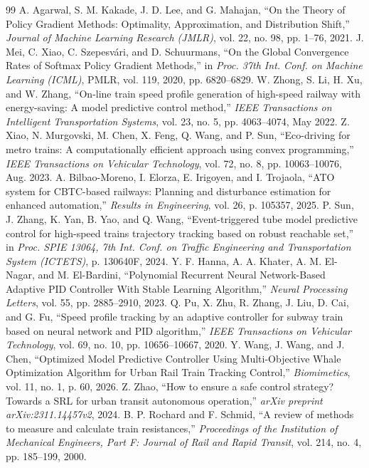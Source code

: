 \documentclass[10pt,a4paper]{article}
\begin{document}
\begin{thebibliography}{99}
 A. Agarwal, S. M. Kakade, J. D. Lee, and G. Mahajan, ``On the Theory of Policy Gradient Methods: Optimality, Approximation, and Distribution Shift,'' \emph{Journal of Machine Learning Research (JMLR)}, vol. 22, no. 98, pp. 1--76, 2021.
 J. Mei, C. Xiao, C. Szepesv\'ari, and D. Schuurmans, ``On the Global Convergence Rates of Softmax Policy Gradient Methods,'' in \emph{Proc. 37th Int. Conf. on Machine Learning (ICML)}, PMLR, vol. 119, 2020, pp. 6820--6829.
 W. Zhong, S. Li, H. Xu, and W. Zhang, ``On-line train speed profile generation of high-speed railway with energy-saving: A model predictive control method,'' \emph{IEEE Transactions on Intelligent Transportation Systems}, vol. 23, no. 5, pp. 4063--4074, May 2022.
 Z. Xiao, N. Murgovski, M. Chen, X. Feng, Q. Wang, and P. Sun, ``Eco-driving for metro trains: A computationally efficient approach using convex programming,'' \emph{IEEE Transactions on Vehicular Technology}, vol. 72, no. 8, pp. 10063--10076, Aug. 2023.
 A. Bilbao-Moreno, I. Elorza, E. Irigoyen, and I. Trojaola, ``ATO system for CBTC-based railways: Planning and disturbance estimation for enhanced automation,'' \emph{Results in Engineering}, vol. 26, p. 105357, 2025.
 P. Sun, J. Zhang, K. Yan, B. Yao, and Q. Wang, ``Event-triggered tube model predictive control for high-speed trains trajectory tracking based on robust reachable set,'' in \emph{Proc. SPIE 13064, 7th Int. Conf. on Traffic Engineering and Transportation System (ICTETS)}, p. 130640F, 2024.
 Y. F. Hanna, A. A. Khater, A. M. El-Nagar, and M. El-Bardini, ``Polynomial Recurrent Neural Network-Based Adaptive PID Controller With Stable Learning Algorithm,'' \emph{Neural Processing Letters}, vol. 55, pp. 2885--2910, 2023.
 Q. Pu, X. Zhu, R. Zhang, J. Liu, D. Cai, and G. Fu, ``Speed profile tracking by an adaptive controller for subway train based on neural network and PID algorithm,'' \emph{IEEE Transactions on Vehicular Technology}, vol. 69, no. 10, pp. 10656--10667, 2020.
 Y. Wang, J. Wang, and J. Chen, ``Optimized Model Predictive Controller Using Multi-Objective Whale Optimization Algorithm for Urban Rail Train Tracking Control,'' \emph{Biomimetics}, vol. 11, no. 1, p. 60, 2026.
 Z. Zhao, ``How to ensure a safe control strategy? Towards a SRL for urban transit autonomous operation,'' \emph{arXiv preprint arXiv:2311.14457v2}, 2024.
 B. P. Rochard and F. Schmid, ``A review of methods to measure and calculate train resistances,'' \emph{Proceedings of the Institution of Mechanical Engineers, Part F: Journal of Rail and Rapid Transit}, vol. 214, no. 4, pp. 185--199, 2000.

\end{thebibliography}
\end{document}
